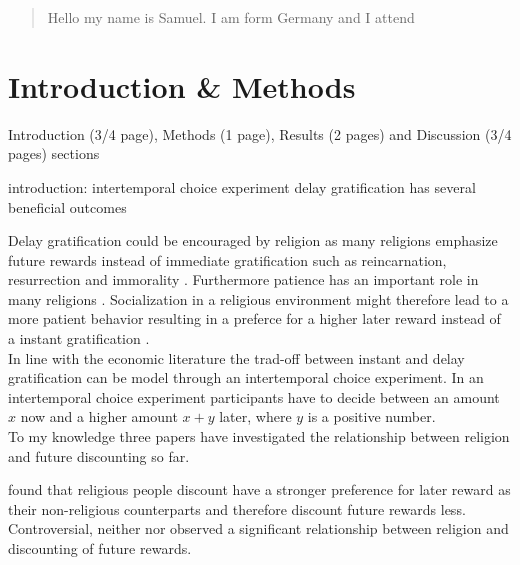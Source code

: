 \documentclass[12pt,a4paper]{article}
\begin{document}

\newpage

\tableofcontents
\listoffigures
\listoftables

\newpage

\begin{abstract}
Hello my name is Samuel. I am form Germany and I attend
\end{abstract}
 

\section{Introduction \& Methods}
Introduction (3/4 page), Methods (1 page), 
Results (2 pages) and Discussion (3/4 pages) sections


introduction: intertemporal choice experiment
delay gratification has several beneficial outcomes 
 
Delay gratification could be encouraged by religion as many religions emphasize future rewards instead of immediate gratification such as reincarnation, resurrection and immorality \parencite{carter2012religious}. Furthermore patience has an important role in many religions \parencite{carter2012religious}. Socialization in a religious environment might therefore lead to a more patient behavior resulting in a preferce for a higher later reward instead of a instant gratification \parencite{carter2012religious}.\\
In line with the economic literature the trad-off between instant and delay gratification can be model through an intertemporal choice experiment. In an intertemporal choice experiment participants have to decide between an amount $x$ now and a higher amount $x+y$ later, where $y$ is a positive number.\\ 

To my knowledge three papers have investigated the relationship between religion and future discounting so far. 
 
\textcite{carter2012religious} found that religious people discount have a stronger preference for later reward as their non-religious counterparts and therefore discount future rewards less. Controversial, neither \textcite{thornton2015divine} nor \textcite{benjamin2010religious} observed a significant relationship between religion and discounting of future rewards.\\ 
\end{document}

